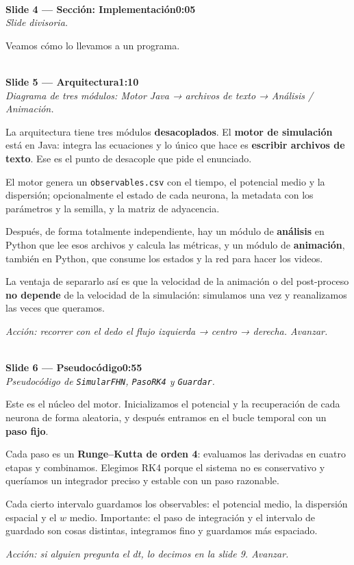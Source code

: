 \documentclass[11pt]{article}
\newcommand{\slide}[3]{%
  \vspace{6pt}%
  \noindent{\color{azulOscuro}\rule{3.2cm}{2pt}}\\[2pt]
  \noindent\textbf{\color{azulOscuro}#1}\hfill\textbf{\color{azulMedio}#3}\\[-2pt]
  {\small\color{grisTexto}\itshape #2}\\[2pt]
}
\begin{document}
\slide{Slide 4 — Sección: Implementación}{Slide divisoria.}{0:05}
\begin{guion}
Veamos cómo lo llevamos a un programa.
\end{guion}

\slide{Slide 5 — Arquitectura}{Diagrama de tres módulos: Motor Java → archivos de texto → Análisis / Animación.}{1:10}
\begin{guion}
La arquitectura tiene tres módulos \textbf{desacoplados}. El \textbf{motor de simulación} está en Java: integra las ecuaciones y lo único que hace es \textbf{escribir archivos de texto}. Ese es el punto de desacople que pide el enunciado.

El motor genera un \texttt{observables.csv} con el tiempo, el potencial medio y la dispersión; opcionalmente el estado de cada neurona, la metadata con los parámetros y la semilla, y la matriz de adyacencia.

Después, de forma totalmente independiente, hay un módulo de \textbf{análisis} en Python que lee esos archivos y calcula las métricas, y un módulo de \textbf{animación}, también en Python, que consume los estados y la red para hacer los videos.

La ventaja de separarlo así es que la velocidad de la animación o del post-proceso \textbf{no depende} de la velocidad de la simulación: simulamos una vez y reanalizamos las veces que queramos.
\end{guion}
\textit{Acción: recorrer con el dedo el flujo izquierda → centro → derecha. Avanzar.}

\slide{Slide 6 — Pseudocódigo}{Pseudocódigo de \texttt{SimularFHN}, \texttt{PasoRK4} y \texttt{Guardar}.}{0:55}
\begin{guion}
Este es el núcleo del motor. Inicializamos el potencial y la recuperación de cada neurona de forma aleatoria, y después entramos en el bucle temporal con un \textbf{paso fijo}.

Cada paso es un \textbf{Runge--Kutta de orden 4}: evaluamos las derivadas en cuatro etapas y combinamos. Elegimos RK4 porque el sistema no es conservativo y queríamos un integrador preciso y estable con un paso razonable.

Cada cierto intervalo guardamos los observables: el potencial medio, la dispersión espacial y el $w$ medio. Importante: el paso de integración y el intervalo de guardado son cosas distintas, integramos fino y guardamos más espaciado.
\end{guion}
\textit{Acción: si alguien pregunta el dt, lo decimos en la slide 9. Avanzar.}
\end{document}
